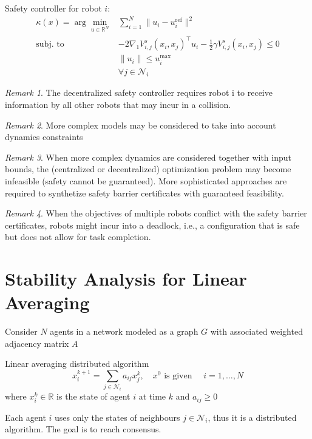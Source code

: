\documentclass{book}
\newcommand{\R}{\mathbb{R}}
\theoremstyle{theoremv2}
\theoremstyle{defv2}
\theoremstyle{remark}
\newtheorem*{remark}{Remark}
\theoremstyle{remark}
\theoremstyle{definition}
\theoremstyle{definition}
\begin{document}
Safety controller for robot $i$: 
\begin{align*}
    \kappa(x) = \arg \min_{u\in\R^N} &\displaystyle\sum_{i=1}^{N} \|u_i-u_i^\text{ref}\|^2\\
    \text{subj. to } & -2\nabla_1V_{i,j}^s(x_i,x_j)^\top u_i - \frac{1}{2} \gamma V_{i,j}^s(x_i,x_j) \leq 0\\ 
    & \|u_i\|\leq u_i^\text{max}\\
    & \forall j \in \mathcal{N}_i
\end{align*}

\begin{remark}
    The decentralized safety controller requires robot i to receive information by all other robots that may incur in a collision. 
\end{remark}
\begin{remark}
    More complex models may be considered to take into account dynamics constraints
\end{remark}
\begin{remark}
    When more complex dynamics are considered together with input bounds, the (centralized or decentralized) optimization problem may become infeasible (safety cannot be guaranteed). More sophisticated approaches are required to synthetize safety barrier certificates with guaranteed feasibility. 
\end{remark}
\begin{remark}
    When the objectives of multiple robots conflict with the safety barrier certificates, robots might incur into a deadlock, i.e., a configuration that is safe but does not allow for task completion. 
\end{remark}


\chapter{Stability Analysis for Linear Averaging}
Consider $N$ agents in a network modeled as a graph $G$ with associated weighted adjacency matrix $A$

Linear averaging distributed algorithm 
\[
    x^{k+1}_i = \displaystyle\sum_{j\in\mathcal{N}_i}a_{ij}x_j^k, \quad x^0 \text{ is given } \quad i=1,\dots,N
\]
where $x_i^k\in\R$ is the state of agent $i$ at time $k$ and $a_{ij}\geq 0$ 

Each agent $i$ uses only the states of neighbours $j\in\mathcal{N}_i$, thus it is a distributed algorithm. The goal is to reach consensus. 
\end{document}
